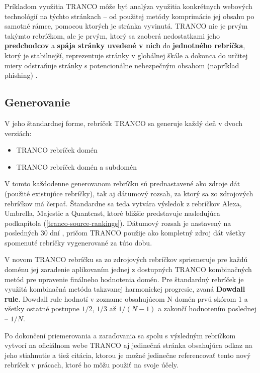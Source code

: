 Príkladom využitia TRANCO môže byť analýza využitia konkrétnych webových technológií na týchto stránkach -- od použitej metódy komprimácie jej obsahu po samotné rámce, pomocou ktorých je 
stránka vyvinutá. 
TRANCO nie je prvým takýmto rebríčkom, ale je prvým, ktorý sa zaoberá nedostatkami jeho \textbf{predchodcov} a \textbf{spája stránky uvedené v nich} do \textbf{jednotného rebríčka}, 
ktorý je stabilnejší, reprezentuje stránky v globálnej škále a dokonca do určitej miery odstraňuje stránky s potencionálne nebezpečným obsahom (napríklad phishing) \cite{tranco}. 

\subsection{Generovanie}
\label{tranco-generation}

V jeho štandardnej forme, rebríček TRANCO sa generuje každý deň v dvoch verziách:
\begin{itemize}
    \item TRANCO rebríček domén
    \item TRANCO rebríček domén a subdomén
\end{itemize}

V tomto každodenne generovanom rebríčku sú prednastavené ako zdroje dát (použité existujúce rebríčky), tak aj dátumový rozsah, za ktorý sa zo zdrojových rebríčkov má čerpať.
Štandardne sa teda vytvára výsledok z rebríčkov Alexa, Umbrella, Majestic a Quantcast, ktoré bližšie predstavuje nasledujúca podkapitola (\ref{tranco-source-rankings}). 
Dátumový rozsah je nastavený na posledných 30 dní \cite{tranco-github}, pričom TRANCO použije ako kompletný zdroj dát všetky spomenuté rebríčky vygenerované za túto dobu. 

V novom TRANCO rebríčku sa zo zdrojových rebríčkov spriemeruje pre každú doménu jej zaradenie aplikovaním jednej z dostupných TRANCO kombinačných metód pre upravenie finálneho hodnotenia domén.
Pre štandardný rebríček je využitá kombinačná metóda takzvanej harmonickej progresie, zvaná \textbf{Dowdall rule}. Dowdall rule hodnotí v zozname obsahujúcom N domén prvú skórom 1 a všetky ostatné postupne \(1/2\), \(1/3\) až \(1/(N-1)\) a zakončí hodnotením poslednej -- \(1/N\).\cite{tranco}\cite{tranco-homepage}

Po dokončení priemerovania a zaraďovania sa spolu s výsledným rebríčkom vytvorí na oficiálnom webe TRANCO aj jedinečná stránka obsahujúca odkaz na jeho stiahnutie a tiež citácia, 
ktorou je možné jedinečne referencovať tento nový rebríček v prácach, ktoré ho môžu použiť na svoje účely.

